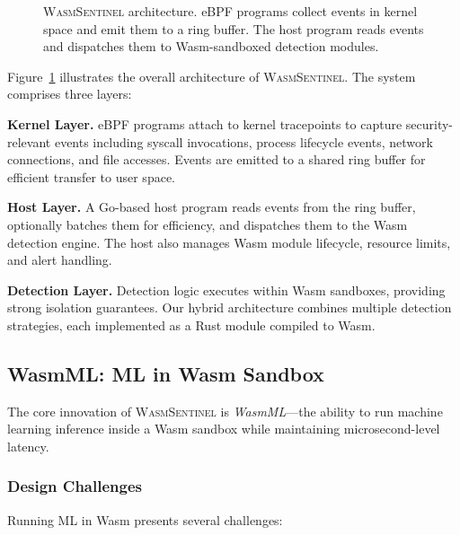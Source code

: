 \begin{figure}[t]
\caption{\textsc{WasmSentinel} architecture. eBPF programs collect events in kernel space and emit them to a ring buffer. The host program reads events and dispatches them to Wasm-sandboxed detection modules.}
\label{fig:architecture}
\end{figure}

Figure~\ref{fig:architecture} illustrates the overall architecture of \textsc{WasmSentinel}.
The system comprises three layers:

\textbf{Kernel Layer.}
eBPF programs attach to kernel tracepoints to capture security-relevant events including syscall invocations, process lifecycle events, network connections, and file accesses.
Events are emitted to a shared ring buffer for efficient transfer to user space.

\textbf{Host Layer.}
A Go-based host program reads events from the ring buffer, optionally batches them for efficiency, and dispatches them to the Wasm detection engine.
The host also manages Wasm module lifecycle, resource limits, and alert handling.

\textbf{Detection Layer.}
Detection logic executes within Wasm sandboxes, providing strong isolation guarantees.
Our hybrid architecture combines multiple detection strategies, each implemented as a Rust module compiled to Wasm.

\subsection{WasmML: ML in Wasm Sandbox}
\label{sec:design-wasmml}

The core innovation of \textsc{WasmSentinel} is \textit{WasmML}---the ability to run machine learning inference inside a Wasm sandbox while maintaining microsecond-level latency.

\subsubsection{Design Challenges}

Running ML in Wasm presents several challenges:

